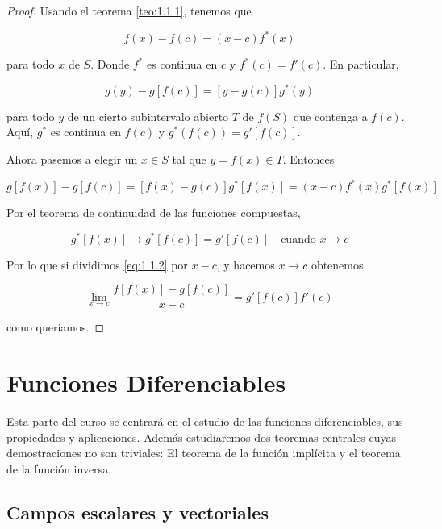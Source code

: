 \begin{proof}
    Usando el teorema \ref{teo:1.1.1}, tenemos que
    
    \[
    f(x) - f(c) = (x-c)f^*(x)
    \]
    
    \noindent para todo $x$ de $S$. Donde $f^*$ es continua en $c$ y $f^*(c) = f'(c)$. En particular,
    
    \[
    g(y) - g[f(c)] = [y - g(c)]g^*(y)
    \]
    
    \noindent para todo $y$ de un cierto subintervalo abierto $T$ de $f(S)$ que contenga a $f(c)$. Aquí, $g^*$ es continua en $f(c)$ y $g^*(f(c)) = g'[f(c)]$.
    
    Ahora pasemos a elegir un $x \in S$ tal que $y = f(x) \in T$. Entonces
    
    \begin{equation}\label{eq:1.1.2}
        g[f(x)] - g[f(c)] = [f(x) - g(c)]g^*[f(x)] = (x-c)f^*(x)g^*[f(x)]
    \end{equation}
    
    Por el teorema de continuidad de las funciones compuestas,
    
    \[
    g^*[f(x)] \rightarrow g^*[f(c)] = g'[f(c)] \quad \text{cuando $x \rightarrow c$}
    \]
    
    Por lo que si dividimos \ref{eq:1.1.2} por $x-c$, y hacemos $x \rightarrow c$ obtenemos
    
    \[
    \lim_{x \to c} \frac{f[f(x)] - g[f(c)]}{x-c} = g'[f(c)]f'(c)
    \]
    
    \noindent como queríamos.
\end{proof}

\section{Funciones Diferenciables}
\addtocounter{sec}{1}

Esta parte del curso se centrará en el estudio de las funciones diferenciables, sus propiedades y aplicaciones. Además estudiaremos dos teoremas centrales cuyas demostraciones no son triviales: El teorema de la función implícita y el teorema de la función inversa.

\subsection{Campos escalares y vectoriales}


